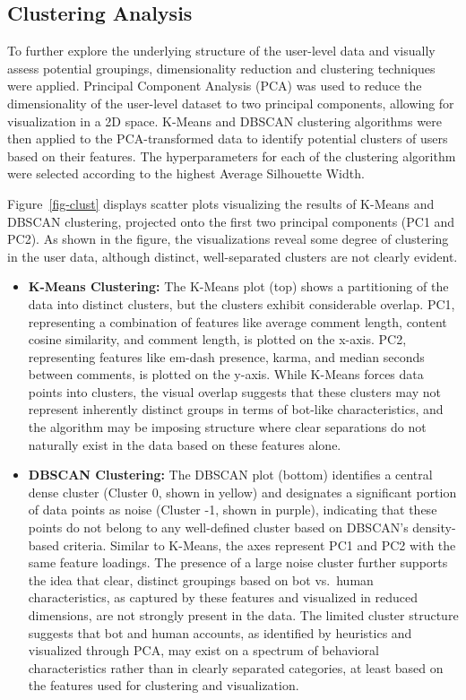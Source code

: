 \documentclass[
  12pt,
  letterpaper,
  DIV=11,
  numbers=noendperiod,
  abstract]{scrartcl}
\begin{document}
\subsection{Clustering Analysis}\label{clustering-analysis}

To further explore the underlying structure of the user-level data and
visually assess potential groupings, dimensionality reduction and
clustering techniques were applied. Principal Component Analysis (PCA)
was used to reduce the dimensionality of the user-level dataset to two
principal components, allowing for visualization in a 2D space. K-Means
and DBSCAN clustering algorithms were then applied to the
PCA-transformed data to identify potential clusters of users based on
their features. The hyperparameters for each of the clustering algorithm
were selected according to the highest Average Silhouette Width.

Figure~\ref{fig-clust} displays scatter plots visualizing the results of
K-Means and DBSCAN clustering, projected onto the first two principal
components (PC1 and PC2). As shown in the figure, the visualizations
reveal some degree of clustering in the user data, although distinct,
well-separated clusters are not clearly evident.

\begin{itemize}
\item
  \textbf{K-Means Clustering:} The K-Means plot (top) shows a
  partitioning of the data into distinct clusters, but the clusters
  exhibit considerable overlap. PC1, representing a combination of
  features like average comment length, content cosine similarity, and
  comment length, is plotted on the x-axis. PC2, representing features
  like em-dash presence, karma, and median seconds between comments, is
  plotted on the y-axis. While K-Means forces data points into clusters,
  the visual overlap suggests that these clusters may not represent
  inherently distinct groups in terms of bot-like characteristics, and
  the algorithm may be imposing structure where clear separations do not
  naturally exist in the data based on these features alone.
\item
  \textbf{DBSCAN Clustering:} The DBSCAN plot (bottom) identifies a
  central dense cluster (Cluster 0, shown in yellow) and designates a
  significant portion of data points as noise (Cluster -1, shown in
  purple), indicating that these points do not belong to any
  well-defined cluster based on DBSCAN's density-based criteria. Similar
  to K-Means, the axes represent PC1 and PC2 with the same feature
  loadings. The presence of a large noise cluster further supports the
  idea that clear, distinct groupings based on bot vs.~human
  characteristics, as captured by these features and visualized in
  reduced dimensions, are not strongly present in the data. The limited
  cluster structure suggests that bot and human accounts, as identified
  by heuristics and visualized through PCA, may exist on a spectrum of
  behavioral characteristics rather than in clearly separated
  categories, at least based on the features used for clustering and
  visualization.
\end{itemize}
\end{document}
